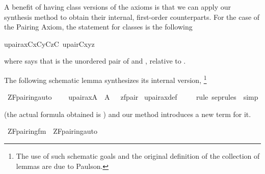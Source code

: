 A benefit of having class versions of the axioms is that we can
apply our synthesis method to obtain their internal, first-order
counterparts. %
For the case of the Pairing Axiom, the statement for classes is the
following
\begin{isabelle}
upair{\isacharunderscore}ax{\isacharparenleft}C{\isacharparenright}{\isacharequal}{\isacharequal}{\isasymforall}x{\isacharbrackleft}C{\isacharbrackright}{\isachardot}{\isasymforall}y{\isacharbrackleft}C{\isacharbrackright}{\isachardot}{\isasymexists}z{\isacharbrackleft}C{\isacharbrackright}{\isachardot}\ upair{\isacharparenleft}C{\isacharcomma}x{\isacharcomma}y{\isacharcomma}z{\isacharparenright}
\end{isabelle}
where  says that  is the unordered pair of
 and , relative to .

The following schematic lemma synthesizes its internal version,%
\footnote{The use of such schematic goals and the original definition
  of the collection of lemmas  are due to Paulson.}
\begin{isabelle}
\isamarkupfalse%
\ ZF{\isacharunderscore}pairing{\isacharunderscore}auto{\isacharcolon}\isanewline
\ \ \ \ {\isachardoublequoteopen}upair{\isacharunderscore}ax{\isacharparenleft}{\isacharhash}{\isacharhash}A{\isacharparenright}\ {\isasymlongleftrightarrow}\ {\isacharparenleft}A{\isacharcomma}\ {\isacharbrackleft}{\isacharbrackright}\ {\isasymTurnstile}\ {\isacharquery}zfpair{\isacharparenright}{\isachardoublequoteclose}\isanewline
{}\isamarkupfalse%
\ upair{\isacharunderscore}ax{\isacharunderscore}def\ \isanewline
\ \ \isamarkupfalse%
\ {\isacharparenleft}{\isacharparenleft}rule\ sep{\isacharunderscore}rules\ {\isacharbar}\ simp{\isacharparenright}{\isacharplus}{\isacharparenright}
\end{isabelle}
(the actual formula obtained is
) and
our  method introduces a new term
 for it.
\begin{isabelle}
\isamarkupfalse%
\ {\isachardoublequoteopen}ZF{\isacharunderscore}pairing{\isacharunderscore}fm{\isachardoublequoteclose}\ \ {\isachardoublequoteopen}ZF{\isacharunderscore}pairing{\isacharunderscore}auto{\isachardoublequoteclose}%
\end{isabelle}


